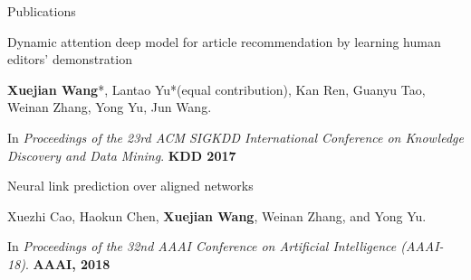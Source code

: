 \documentclass{resume} %
\begin{document}
\begin{rSection}{Publications}
\begin{rSubsection}{Dynamic attention deep model for article recommendation by learning human editors' demonstration}{}{}{}
\item \textbf{Xuejian Wang}*, Lantao Yu*(equal contribution), Kan Ren, Guanyu Tao, Weinan Zhang, Yong Yu, Jun Wang.
\item In \emph{Proceedings of the 23rd ACM SIGKDD International Conference on Knowledge Discovery and Data Mining}. \textbf{KDD 2017}
\end{rSubsection}
\vspace{-5pt}
\begin{rSubsection}{Neural link prediction over aligned networks}{}{}{}
\item Xuezhi Cao, Haokun Chen, \textbf{Xuejian Wang}, Weinan Zhang, and Yong Yu.
\item In \emph{Proceedings of the 32nd AAAI Conference on Artificial Intelligence (AAAI-18)}. \textbf{AAAI, 2018}

\end{rSubsection}
\end{rSection}
\end{document}
